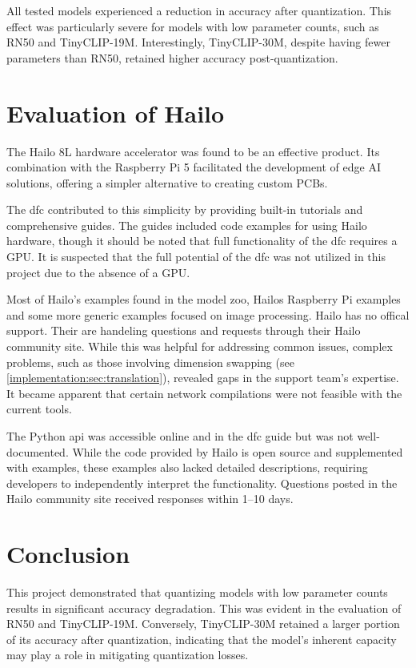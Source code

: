 All tested models experienced a reduction in accuracy after quantization.  
This effect was particularly severe for models with low parameter counts, such as RN50 and TinyCLIP-19M.  
Interestingly, TinyCLIP-30M, despite having fewer parameters than RN50, retained higher accuracy post-quantization.  

\section{Evaluation of Hailo}  
The Hailo 8L hardware accelerator was found to be an effective product.  
Its combination with the Raspberry Pi 5 facilitated the development of edge AI solutions, offering a simpler alternative to creating custom PCBs.  

The \acrshort{dfc} contributed to this simplicity by providing built-in tutorials and comprehensive guides.  
The guides included code examples for using Hailo hardware, though it should be noted that full functionality of the \acrshort{dfc} requires a GPU.  
It is suspected that the full potential of the \acrshort{dfc} was not utilized in this project due to the absence of a GPU.  

Most of Hailo's examples found in the model zoo\cite{hailo_model_zoo}, Hailos Raspberry Pi examples\cite{hailo_rpi5_examples} and some more generic examples\cite{hailo_application_code_examples} focused on image processing.
Hailo has no offical support.
Their are handeling questions and requests through their Hailo community site.  
While this was helpful for addressing common issues, complex problems, such as those involving dimension swapping (see \cref{implementation:sec:translation}), revealed gaps in the support team's expertise.  
It became apparent that certain network compilations were not feasible with the current tools.  

The Python \acrfull{api} was accessible online and in the \acrshort{dfc} guide but was not well-documented.  
While the code provided by Hailo is open source and supplemented with examples, these examples also lacked detailed descriptions, requiring developers to independently interpret the functionality.  
Questions posted in the Hailo community site received responses within 1–10 days.  

\section{Conclusion}  
This project demonstrated that quantizing models with low parameter counts results in significant accuracy degradation.  
This was evident in the evaluation of RN50 and TinyCLIP-19M.  
Conversely, TinyCLIP-30M retained a larger portion of its accuracy after quantization, indicating that the model's inherent capacity may play a role in mitigating quantization losses.  

